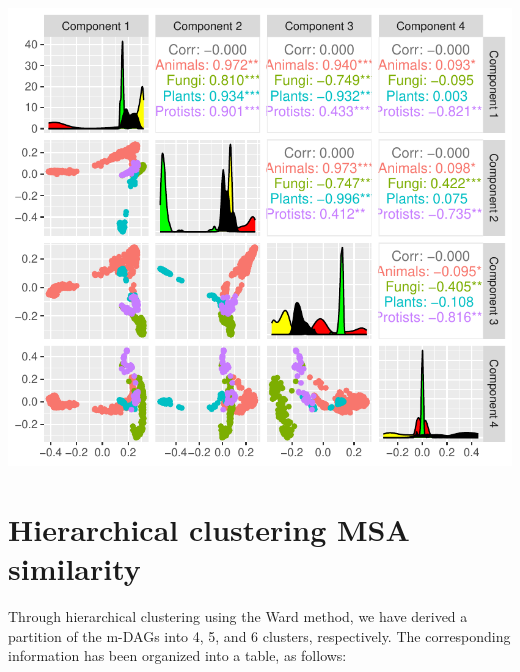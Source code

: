 \documentclass[
  letterpaper,
  DIV=11,
  numbers=noendperiod]{scrreprt}
\newenvironment{Shaded}{}{}
\newcommand{\AttributeTok}[1]{\textcolor[rgb]{0.78,0.47,0.87}{#1}}
\newcommand{\DecValTok}[1]{\textcolor[rgb]{0.82,0.60,0.40}{#1}}
\newcommand{\FunctionTok}[1]{\textcolor[rgb]{0.38,0.69,0.94}{#1}}
\newcommand{\NormalTok}[1]{\textcolor[rgb]{0.67,0.70,0.75}{#1}}
\newcommand{\OtherTok}[1]{\textcolor[rgb]{0.15,0.68,0.38}{#1}}
\newcommand{\SpecialCharTok}[1]{\textcolor[rgb]{0.34,0.71,0.76}{#1}}
\newcommand{\StringTok}[1]{\textcolor[rgb]{0.60,0.76,0.47}{#1}}
\begin{document}
\begin{center}
\includegraphics[width=1\textwidth,height=\textheight]{m_DAGs_similarity_files/figure-pdf/unnamed-chunk-12-1.pdf}
\end{center}

\section{Hierarchical clustering MSA
similarity}\label{hierarchical-clustering-msa-similarity}

Through hierarchical clustering using the Ward method, we have derived a
partition of the m-DAGs into 4, 5, and 6 clusters, respectively. The
corresponding information has been organized into a table, as follows:

\begin{Shaded}
\end{Shaded}
\end{document}
